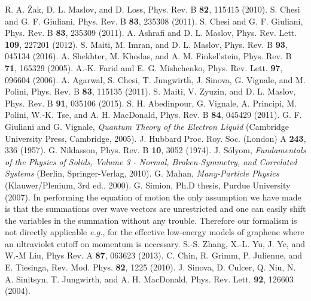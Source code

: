 \documentclass[aps, pra, reprint,superscriptaddress]{revtex4-1}
\begin{document}
\begin{thebibliography}{90}
%
 R. A. \.Zak, D. L. Maslov, and D. Loss, Phys. Rev. B \textbf{82}, 115415 (2010).
%
S. Chesi and G. F. Giuliani, Phys. Rev. B \textbf{83}, 235308 (2011).
%
S. Chesi and G. F. Giuliani, Phys. Rev. B \textbf{83}, 235309 (2011).
%
 A. Ashrafi and D. L. Maslov, Phys. Rev. Lett. \textbf{109}, 227201 (2012). 
%
 S. Maiti, M. Imran, and D. L. Maslov, Phys. Rev. B \textbf{93}, 045134 (2016).
%
A. Shekhter, M. Khodas, and A. M. Finkel'stein, Phys. Rev. B \textbf{71}, 165329 (2005).
%
A.-K. Farid and E. G. Mishchenko, Phys. Rev. Lett. \textbf{97}, 096604 (2006).
%
A. Agarwal, S. Chesi, T. Jungwirth, J. Sinova, G. Vignale, and M. Polini, Phys. Rev. B \textbf{83}, 115135 (2011).
% 
S. Maiti, V. Zyuzin, and D. L. Maslov, Phys. Rev. B \textbf{91}, 035106 (2015).
%
S. H. Abedinpour, G. Vignale, A. Principi, M. Polini, W.-K. Tse, and A. H.  MacDonald, Phys. Rev. B \textbf{84}, 045429 (2011).
%
 G. F. Giuliani and G. Vignale, \textit{Quantum Theory of the Electron Liquid} (Cambridge University Press, Cambridge, 2005).
%
 J. Hubbard Proc. Roy. Soc. (London) A \textbf{243}, 336 (1957). 
%
 G. Niklasson, Phys. Rev. B \textbf{10}, 3052 (1974).
%
 J. S\'{o}lyom, \textit{Fundamentals of the Physics of Solids, Volume 3 - Normal, Broken-Symmetry, and Correlated Systems} (Berlin, Springer-Verlag, 2010).
%
 G. Mahan, \textit{Many-Particle Physics} (Klauwer/Plenium, 3rd ed., 2000).
%
 G. Simion, Ph.D thesis, Purdue University (2007).
%
 In performing the equation of motion the only assumption we have made is that the summations over wave vectors are unrestricted and one can easily shift the variables in the summation without any trouble. Therefore our formalism is not directly applicable \textit{e.g.}, for the effective low-energy models of graphene where an ultraviolet cutoff on momentum is necessary. 
%
 S.-S. Zhang, X.-L. Yu, J. Ye, and W.-M Liu, Phys Rev. A \textbf{87}, 063623 (2013).  
%
 C. Chin, R. Grimm, P. Julienne, and E. Tiesinga,  Rev. Mod. Phys. \textbf{82}, 1225 (2010).
%
 J. Sinova, D. Culcer, Q. Niu, N. A. Sinitsyn, T. Jungwirth, and A. H. MacDonald, Phys. Rev. Lett. \textbf{92}, 126603 (2004). 
%
\end{thebibliography}
 
  
\end{document}
